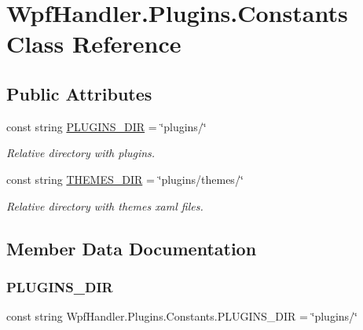 \hypertarget{class_wpf_handler_1_1_plugins_1_1_constants}{}\section{Wpf\+Handler.\+Plugins.\+Constants Class Reference}
\label{class_wpf_handler_1_1_plugins_1_1_constants}
\subsection*{Public Attributes}
\begin{DoxyCompactItemize}
\item 
const string \mbox{\hyperlink{class_wpf_handler_1_1_plugins_1_1_constants_a96f55ef86fe92a534722f4788340f390}{P\+L\+U\+G\+I\+N\+S\+\_\+\+D\+IR}} = \char`\"{}plugins/\char`\"{}
\begin{DoxyCompactList}\small\item\em Relative directory with plugins. \end{DoxyCompactList}\item 
const string \mbox{\hyperlink{class_wpf_handler_1_1_plugins_1_1_constants_aa7969fd3e77b585b42f0c99a5440dbb2}{T\+H\+E\+M\+E\+S\+\_\+\+D\+IR}} = \char`\"{}plugins/themes/\char`\"{}
\begin{DoxyCompactList}\small\item\em Relative directory with themes xaml files. \end{DoxyCompactList}\end{DoxyCompactItemize}


\subsection{Member Data Documentation}
\mbox{\label{class_wpf_handler_1_1_plugins_1_1_constants_a96f55ef86fe92a534722f4788340f390}} 
\subsubsection{\texorpdfstring{P\+L\+U\+G\+I\+N\+S\+\_\+\+D\+IR}{PLUGINS\_DIR}}
{\footnotesize\ttfamily const string Wpf\+Handler.\+Plugins.\+Constants.\+P\+L\+U\+G\+I\+N\+S\+\_\+\+D\+IR = \char`\"{}plugins/\char`\"{}}



